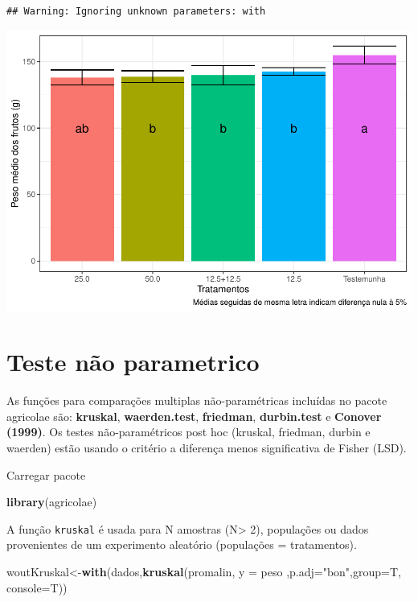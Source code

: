 \documentclass[
]{book}
\newenvironment{Shaded}{\begin{snugshade}}{\end{snugshade}}
\newcommand{\DataTypeTok}[1]{\textcolor[rgb]{0.13,0.29,0.53}{#1}}
\newcommand{\KeywordTok}[1]{\textcolor[rgb]{0.13,0.29,0.53}{\textbf{#1}}}
\newcommand{\NormalTok}[1]{#1}
\newcommand{\StringTok}[1]{\textcolor[rgb]{0.31,0.60,0.02}{#1}}
\begin{document}
\begin{verbatim}
## Warning: Ignoring unknown parameters: with
\end{verbatim}

\includegraphics{TudodoR_files/figure-latex/unnamed-chunk-303-1.pdf}

\hypertarget{teste-nuxe3o-parametrico}{%
\section{Teste não parametrico}\label{teste-nuxe3o-parametrico}}

As funções para comparações multiplas não-paramétricas incluídas no pacote agricolae são: \textbf{kruskal}, \textbf{waerden.test}, \textbf{friedman}, \textbf{durbin.test} e \textbf{Conover (1999)}.
Os testes não-paramétricos post hoc (kruskal, friedman, durbin e waerden) estão usando o critério a diferença menos significativa de Fisher (LSD).

Carregar pacote

\begin{Shaded}
\begin{Highlighting}[]
\KeywordTok{library}\NormalTok{(agricolae)}
\end{Highlighting}
\end{Shaded}

A função \texttt{kruskal} é usada para N amostras (N\textgreater{} 2), populações ou dados provenientes de um experimento aleatório (populações = tratamentos).

\begin{Shaded}
\begin{Highlighting}[]
\NormalTok{woutKruskal<-}\KeywordTok{with}\NormalTok{(dados,}\KeywordTok{kruskal}\NormalTok{(promalin, }\DataTypeTok{y =}\NormalTok{ peso}
\NormalTok{  ,}\DataTypeTok{p.adj=}\StringTok{"bon"}\NormalTok{,}\DataTypeTok{group=}\NormalTok{T, }\DataTypeTok{console=}\NormalTok{T))}
\end{Highlighting}
\end{Shaded}
\end{document}
